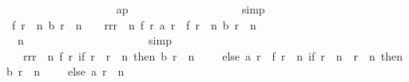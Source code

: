 \begin{isabellebody}
\ \ \ \ \ \ \ \ \ \ \ \ \ \ \ \ \ \ \isamarkupfalse%
\ ap\isanewline
\ \ \ \ \ \ \ \ \ \ \ \ \ \ \ \ \ \ \isamarkupfalse%
\ simp\isanewline
\ \ \ \ \ \ \ \ \ \ \ \ \ \ \ \ \isamarkupfalse%
\ {\isachardoublequoteopen}f\ {\isacharparenleft}r{}\ {\isacharplus}\ n{\isacharparenright}\ {\isacharparenleft}b\ {\isacharparenleft}r{}\ {\isacharplus}\ n\ {\isacharminus}\ {}{\isacharparenright}{\isacharparenright}\ {\isacharequal}\ {\isacharparenleft}{\isacharparenleft}{\isasymSum}r{\isacharprime}{\isasymleftarrow}{\isacharbrackleft}r{}{\isachardot}{\isachardot}{\isacharless}r{}\ {\isacharplus}\ n{\isacharbrackright}{\isachardot}\ f\ r{\isacharprime}\ {\isacharparenleft}a\ r{\isacharprime}{\isacharparenright}{\isacharparenright}{\isacharparenright}\ {\isacharplus}\ f\ {\isacharparenleft}r{}\ {\isacharplus}\ n{\isacharparenright}\ {\isacharparenleft}b\ {\isacharparenleft}r{}\ {\isacharplus}\ n\ {\isacharminus}\ {}{\isacharparenright}\ {\isacharplus}\ {}{\isacharparenright}{\isachardoublequoteclose}\isanewline
\ \ \ \ \ \ \ \ \ \ \ \ \ \ \ \ \ \ \isamarkupfalse%
\ {\isacharasterisk}{\isacharparenleft}{}{\isacharparenright}\ {\isacharbackquoteopen}n\ {\isasymnoteq}\ {}{\isacharbackquoteclose}\isanewline
\ \ \ \ \ \ \ \ \ \ \ \ \ \ \ \ \ \ \isamarkupfalse%
\ simp\isanewline
\ \ \ \ \ \ \ \ \ \ \ \ \ \ \ \ \isamarkupfalse%
\ \isamarkupfalse%
\ {\isachardoublequoteopen}{\isachardot}{\isachardot}{\isachardot}\ {\isacharequal}\ {\isacharparenleft}{\isasymSum}r{\isacharprime}{\isasymleftarrow}{\isacharbrackleft}r{}{\isachardot}{\isachardot}{\isacharless}r{}\ {\isacharplus}\ n{\isacharbrackright}{\isachardot}\ f\ r{\isacharprime}\ {\isacharparenleft}if\ r{\isacharprime}\ {\isacharequal}\ r{}\ {\isacharplus}\ n\ then\ b\ {\isacharparenleft}r{}\ {\isacharplus}\ n\ {\isacharminus}\ {}{\isacharparenright}\ {\isacharplus}\ {}\ else\ {\isacharparenleft}a\ r{\isacharprime}{\isacharparenright}{\isacharparenright}{\isacharparenright}\ {\isacharplus}\ f\ {\isacharparenleft}r{}\ {\isacharplus}\ n{\isacharparenright}\ {\isacharparenleft}if\ r{}\ {\isacharplus}\ n\ {\isacharequal}\ r{}\ {\isacharplus}\ n\ then\ b\ {\isacharparenleft}r{}\ {\isacharplus}\ n\ {\isacharminus}\ {}{\isacharparenright}\ {\isacharplus}\ {}\ else\ {\isacharparenleft}a\ {\isacharparenleft}r{}\ {\isacharplus}\ n{\isacharparenright}{\isacharparenright}{\isacharparenright}{\isachardoublequoteclose}\isanewline

\end{isabellebody}
